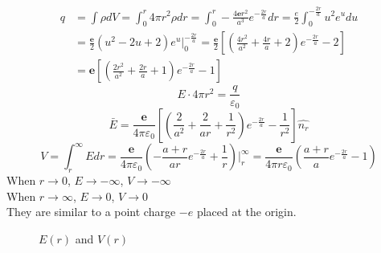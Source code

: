 \documentclass{article}
\begin{document}
\section{}
\begin{align*}
q&=\int\rho dV=\int_0^r4\pi r^2\rho dr=\int_0^r-\frac{4\textbf{e}r^2}{a^3}e^{-\frac{2r}{a}}dr=\frac{e}{2}\int_0^{-\frac{2r}{a}}u^2e^udu\\
&=\frac{\textbf{e}}{2}(u^2-2u+2)e^u\bigg|_0^{-\frac{2r}{a}}=\frac{\textbf{e}}{2}\left[\left(\frac{4r^2}{a^2}+\frac{4r}{a}+2\right)e^{-\frac{2r}{a}}-2\right]\\
&=\textbf{e}\left[\left(\frac{2r^2}{a^2}+\frac{2r}{a}+1\right)e^{-\frac{2r}{a}}-1\right]
\end{align*}
$$E\cdot4\pi r^2=\frac{q}{\varepsilon_0}$$
$$\bar{E}=\frac{\textbf{e}}{4\pi\varepsilon_0}\left[\left(\frac{2}{a^2}+\frac{2}{ar}+\frac{1}{r^2}\right)e^{-\frac{2r}{a}}-\frac{1}{r^2}\right]\hat{n_r}$$
$$V=\int_r^{\infty}Edr=\frac{\textbf{e}}{4\pi\varepsilon_0}\left(-\frac{a+r}{ar}e^{-\frac{2r}{a}}+\frac{1}{r}\right)\bigg|_r^{\infty}
=\frac{\textbf{e}}{4\pi r\varepsilon_0}\left(\frac{a+r}{a}e^{-\frac{2r}{a}}-1\right)$$
When $r\to0$, $E\to-\infty$, $V\to-\infty$\\
When $r\to\infty$, $E\to0$, $V\to0$\\
They are similar to a point charge $-e$ placed at the origin.
\begin{figure}[h!]
	\centering
	\caption{$E(r)$ and $V(r)$}
	\label{fig-5}
\end{figure}
\end{document}

